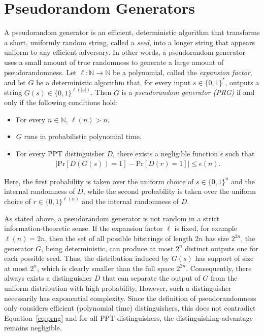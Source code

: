 \section{Pseudorandom Generators}
A pseudorandom generator is an efficient, deterministic algorithm that transforms a short, uniformly random string, called a \emph{seed}, into a longer string that appears uniform to any efficient adversary. In other words, a pseudorandom generator uses a small amount of true randomness to generate a large amount of pseudorandomness. Let $\ell : \mathbb{N} \to \mathbb{N}$ be a polynomial, called the \emph{expansion factor}, and let $G$ be a deterministic algorithm that, for every input $s \in \{0,1\}^*$, outputs a string $G(s)\in\{0,1\}^{\ell(|s|)}$. Then $G$ is a \emph{pseudorandom generator (PRG)} if and only if the following conditions hold:
\begin{itemize}
\item For every $n \in \mathbb{N}$, $\ell(n) > n$.
\item $G$ runs in probabilistic polynomial time.
\item For every PPT distinguisher $D$, there exists a negligible function $\epsilon$ such that 
\begin{align}\label{eq:prng} 
\bigl|\mathrm{Pr}[D(G(s))=1] - \mathrm{Pr}[D(r)=1]\bigr| \leq \epsilon(n).
\end{align}
\end{itemize}

Here, the first probability is taken over the uniform choice of $s \in \{0,1\}^n$ and the internal randomness of $D$, while the second probability is taken over the uniform choice of $r \in \{0,1\}^{\ell(n)}$ and the internal randomness of $D$.

As stated above, a pseudorandom generator is not random in a strict information-theoretic sense. If the expansion factor $\ell$ is fixed, for example $\ell(n) = 2n$, then the set of all possible bitstrings of length $2n$ has size $2^{2n}$, the generator $G$, being deterministic, can produce at most $2^n$ distinct outputs one for each possible seed. Thus, the distribution induced by $G(s)$ has support of size at most $2^n$, which is clearly smaller than the full space $2^{2n}$. Consequently, there always exists a distinguisher $D$ that can separate the output of $G$ from the uniform distribution with high probability. However, such a distinguisher necessarily has exponential complexity. Since the definition of pseudorandomness only considers efficient (polynomial time) distinguishers, this does not contradict Equation~\ref{eq:prng} and for all PPT distinguishers, the distinguishing advantage remains negligible. 

